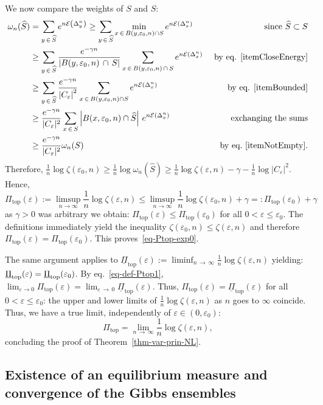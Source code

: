\documentclass[AHL, Unicode, longabstracts,published]{cedram}
\theoremstyle{plain}
\theoremstyle{plain}
\newcommand\eps{\varepsilon}
\newcommand\NLP{\Pi}
\renewcommand\top{{\mathrm{top}}}
\newcommand*\8{\infty}
\newcommand\hS{\widehat{S}}
\newcommand{\En}{\mathcal{E}}
\begin{document}
We now compare the weights of $S$ and $\hS$:
\begin{align*}
\omega_n(\hS) &= \sum_{y\,\in\,\hS} e^{n\En\left(\Delta^n_y\right)}
\geq \sum_{y\,\in\,\hS} \min_{x\,\in\,B(y,\eps_0,n)\cap S} e^{n\En\left(\Delta^n_x\right)} &\text{since }\hS\subset S\\
&\geq \sum_{y\,\in\,\hS} \frac{e^{-\gamma n} }{\left\lvert B(y,\eps_0,n)\,\cap\,S\right\rvert} \sum_{x\,\in\,B(y,\eps_0,n)\,\cap\,S} e^{n\En\left(\Delta^n_x\right)} &\text{ by eq. \eqref{itemCloseEnergy}}\\
&\geq \sum_{y\,\in\,\hS} \frac{e^{-\gamma n}}{\left\lvert C_\eps\right\rvert^2} \sum_{x\,\in\,B(y,\eps_0,n)\cap S} e^{n\En\left(\Delta^n_x\right)} &\text{ by eq. \eqref{itemBounded}}\\
&\geq \frac{e^{-\gamma n}}{\lvert C_\eps\rvert^2} \sum_{x\,\in\,S} \left\lvert B(x,\eps_0,n)\cap\hS\right\rvert \, e^{n\En\left(\Delta^n_x\right)} & \text{exchanging the sums}\\
&\geq \frac{e^{-\gamma n}}{\lvert C_\eps\rvert^2} \omega_n(S) &\text{ by eq.~\eqref{itemNotEmpty}}.
\end{align*}
Therefore, $\frac1n\log\zeta(\eps_0,n)\geq \frac1n\log\omega_n(\hS)\geq\frac1n\log\zeta(\eps,n)-\gamma-\frac1n\log\lvert C_\eps\rvert^2$. Hence,
\[
\Pi_\top(\eps):=\limsup_{n\to\infty}\frac1n\log\zeta(\eps,n)\leq \limsup_{n\to\infty}\frac1n\log\zeta(\eps_0,n)+\gamma=:\Pi_\top(\eps_0)+\gamma
\]
as $\gamma>0$ was arbitrary we obtain: $\NLP_\top(\eps)\leq\NLP_\top(\eps_0)$ for all $0<\eps\leq\eps_0$. The definitions immediately yield the inequality $\zeta(\eps_0,n)\leq\zeta(\eps,n)$ and therefore $\NLP_\top(\eps)=\NLP_\top(\eps_0)$. This proves~\eqref{eq-Ptop-exp0}.



The same argument applies to $\underline{\NLP}_\top(\eps):=\liminf_{n\,\to\,\infty}\frac1n\log\zeta(\eps,n)$ yielding: $\underline{\NLP}_\top(\eps)\linebreak = \underline{\NLP}_\top(\eps_0)$. By eq.~\eqref{eq-def-Ptop1}, $\lim_{\eps\to0} \NLP_\top(\eps)= \lim_{\eps\,\to\,0} \underline{\NLP} _\top(\eps)$. Thus, $\NLP_\top(\eps)= \underline{\NLP} _\top(\eps)$ for all $0<\eps\leq\eps_0$: the upper and lower limits of $\frac1n\log\zeta(\eps,n)$ as $n$ goes to $\infty$ coincide. Thus, we have a true limit, independently of $\eps\in(0,\eps_0)$:
\[
\NLP_\top = \lim_{n\,\to\,\infty} \frac1n\log\zeta(\eps,n),
\]
concluding the proof of Theorem~\ref{thm-var-prin-NL}.


\subsection{Existence of an equilibrium measure and convergence of the Gibbs ensembles}\label{sec:Gibbs}
\end{document}
